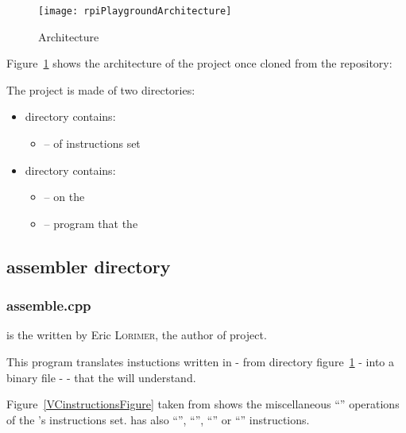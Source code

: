 \begin{figure}[!htbp]
	\centering
	\texttt{[image: rpiPlaygroundArchitecture]}
	\caption{ Architecture}
	\label{rpiPlaygroundFigure}
\end{figure}
\FloatBarrier

Figure~\ref{rpiPlaygroundFigure} shows the architecture of the  project once cloned from the  repository: 

The project is made of two directories:
\begin{itemize}
\item {} directory contains:
	\begin{itemize}
		\item {} --  of \vc{} instructions set
	\end{itemize}
\item {} directory contains:
	\begin{itemize}
		\item {} --  on the \vc
		\item {} -- program that  the \vc
	\end{itemize}
\end{itemize}


\subsection{assembler directory}


\subsubsection{assemble.cpp}

 is the  written by Eric \textsc{Lorimer}, the author of  project.

This program translates instuctions written in  - from  directory figure~\ref{rpiPlaygroundFigure} - into a binary file -  - that the \vc{} will understand.

Figure~\ref{VCinstructionsFigure} taken from \parencite{refVC} shows the miscellaneous \enquote{} operations of the \qpu's instructions set. \vc{} has also \enquote{}, \enquote{}, \enquote{} or \enquote{} instructions.

